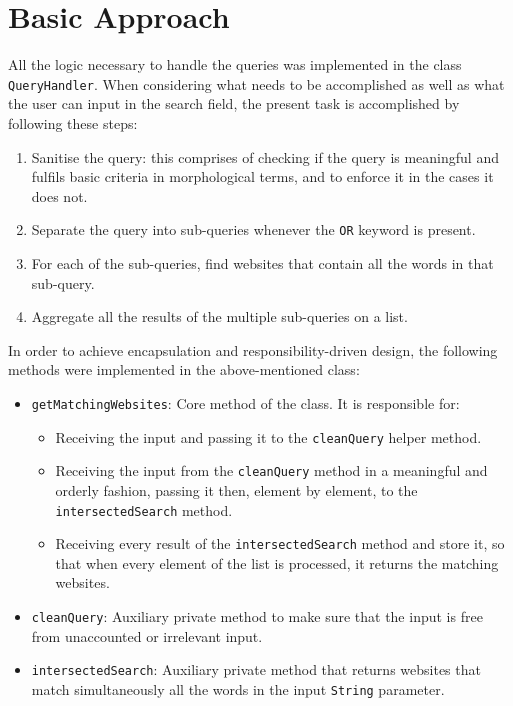 \section{Basic Approach} %
All the logic necessary to handle the queries was implemented in the class {\tt QueryHandler}.
When considering what needs to be accomplished as well as what the user can input in the search field, the present task is accomplished by following these steps:
\begin{enumerate}
    \item Sanitise the query: this comprises of checking if the query is meaningful and fulfils basic criteria in morphological terms, and to enforce it in the cases it does not.
    \item Separate the query into sub-queries whenever the {\tt OR} keyword is present.
    \item For each of the sub-queries, find websites that contain all the words in that sub-query.
    \item Aggregate all the results of the multiple sub-queries on a list.
\end{enumerate}
In order to achieve encapsulation and responsibility-driven design, the following methods were implemented in the above-mentioned class:
\begin{itemize}
    \item {\tt getMatchingWebsites}: Core method of the class. It is responsible for:
    \begin{itemize}
        \item Receiving the input and passing it to the {\tt cleanQuery} helper method.
        \item Receiving the input from the {\tt cleanQuery} method in a meaningful and orderly fashion, passing it then, element by element, to the {\tt intersectedSearch} method.
        \item Receiving every result of the {\tt intersectedSearch} method and store it, so that when every element of the list is processed, it returns the matching websites.
    \end{itemize}
    \item {\tt cleanQuery}: Auxiliary private method to make sure that the input is free from unaccounted or irrelevant input.
    \item {\tt intersectedSearch}: Auxiliary private method that returns websites that match simultaneously all the words in the input {\tt String} parameter.
\end{itemize}

